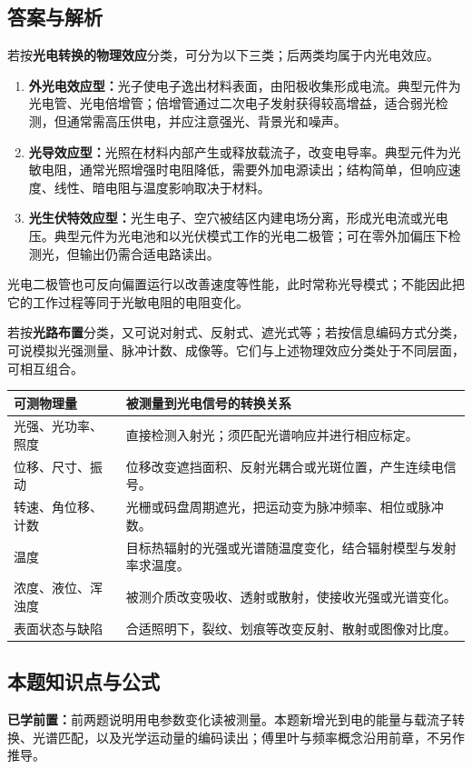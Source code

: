 \subsection*{答案与解析}
若按\textbf{光电转换的物理效应}分类，可分为以下三类；后两类均属于内光电效应。
\begin{enumerate}
\item \textbf{外光电效应型：}光子使电子逸出材料表面，由阳极收集形成电流。典型元件为光电管、光电倍增管；倍增管通过二次电子发射获得较高增益，适合弱光检测，但通常需高压供电，并应注意强光、背景光和噪声。
\item \textbf{光导效应型：}光照在材料内部产生或释放载流子，改变电导率。典型元件为光敏电阻，通常光照增强时电阻降低，需要外加电源读出；结构简单，但响应速度、线性、暗电阻与温度影响取决于材料。
\item \textbf{光生伏特效应型：}光生电子、空穴被结区内建电场分离，形成光电流或光电压。典型元件为光电池和以光伏模式工作的光电二极管；可在零外加偏压下检测光，但输出仍需合适电路读出。
\end{enumerate}
光电二极管也可反向偏置运行以改善速度等性能，此时常称光导模式；不能因此把它的工作过程等同于光敏电阻的电阻变化。

若按\textbf{光路布置}分类，又可说对射式、反射式、遮光式等；若按信息编码方式分类，可说模拟光强测量、脉冲计数、成像等。它们与上述物理效应分类处于不同层面，可相互组合。

\begin{center}
\small
\begin{tabularx}{\linewidth}{@{}p{2.8cm} X@{}}
\toprule
可测物理量 & 被测量到光电信号的转换关系 \\
\midrule
光强、光功率、照度 & 直接检测入射光；须匹配光谱响应并进行相应标定。 \\
位移、尺寸、振动 & 位移改变遮挡面积、反射光耦合或光斑位置，产生连续电信号。 \\
转速、角位移、计数 & 光栅或码盘周期遮光，把运动变为脉冲频率、相位或脉冲数。 \\
温度 & 目标热辐射的光强或光谱随温度变化，结合辐射模型与发射率求温度。 \\
浓度、液位、浑浊度 & 被测介质改变吸收、透射或散射，使接收光强或光谱变化。 \\
表面状态与缺陷 & 合适照明下，裂纹、划痕等改变反射、散射或图像对比度。 \\
\bottomrule
\end{tabularx}
\end{center}

\subsection*{本题知识点与公式}\label{kn:4-3}
\noindent\textbf{已学前置：}前两题说明用电参数变化读被测量。本题新增光到电的能量与载流子转换、光谱匹配，以及光学运动量的编码读出；傅里叶与频率概念沿用前章，不另作推导。

